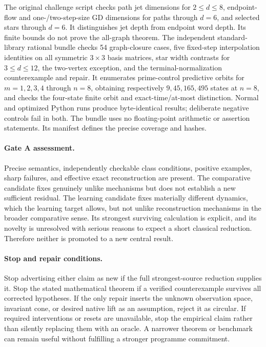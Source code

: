 \documentclass[11pt]{article}
\theoremstyle{remark}
\begin{document}
The original challenge script checks path jet dimensions for $2\leq d\leq8$, endpoint-flow and one-/two-step-size GD dimensions for paths through $d=6$, and selected stars through $d=6$. It distinguishes jet depth from endpoint word depth. Its finite bounds do not prove the all-graph theorem. The independent standard-library rational bundle checks 54 graph-closure cases, five fixed-step interpolation identities on all symmetric $3\times3$ basis matrices, star width contrasts for $3\leq d\leq12$, the two-vertex exception, and the terminal-normalization counterexample and repair. It enumerates prime-control predictive orbits for $m=1,2,3,4$ through $n=8$, obtaining respectively $9,45,165,495$ states at $n=8$, and checks the four-state finite orbit and exact-time/at-most distinction. Normal and optimized Python runs produce byte-identical results; deliberate negative controls fail in both. The bundle uses no floating-point arithmetic or assertion statements. Its manifest defines the precise coverage and hashes.

\paragraph{Gate A assessment.}
Precise semantics, independently checkable class conditions, positive examples, sharp failures, and effective exact reconstruction are present. The comparative candidate fixes genuinely unlike mechanisms but does not establish a new sufficient residual. The learning candidate fixes materially different dynamics, which the learning target allows, but not unlike reconstruction mechanisms in the broader comparative sense. Its strongest surviving calculation is explicit, and its novelty is unresolved with serious reasons to expect a short classical reduction. Therefore neither is promoted to a new central result.

\paragraph{Stop and repair conditions.}
Stop advertising either claim as new if the full strongest-source reduction supplies it. Stop the stated mathematical theorem if a verified counterexample survives all corrected hypotheses. If the only repair inserts the unknown observation space, invariant cone, or desired native lift as an assumption, reject it as circular. If required interventions or resets are unavailable, stop the empirical claim rather than silently replacing them with an oracle. A narrower theorem or benchmark can remain useful without fulfilling a stronger programme commitment.
\end{document}
